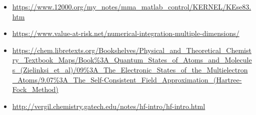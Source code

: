 \documentclass[10pt, oneside, letterpaper]{article}
\begin{document}
\begin{itemize}
  \item \url{https://www.12000.org/my_notes/mma_matlab_control/KERNEL/KEse83.htm} %
  \item \url{https://www.value-at-risk.net/numerical-integration-multiple-dimensions/} %
  \item \url{https://chem.libretexts.org/Bookshelves/Physical_and_Theoretical_Chemistry_Textbook_Maps/Book%3A_Quantum_States_of_Atoms_and_Molecules_(Zielinksi_et_al)/09%3A_The_Electronic_States_of_the_Multielectron_Atoms/9.07%3A_The_Self-Consistent_Field_Approximation_(Hartree-Fock_Method)} %
  \item \url{http://vergil.chemistry.gatech.edu/notes/hf-intro/hf-intro.html} %

\end{itemize}
\end{document}
